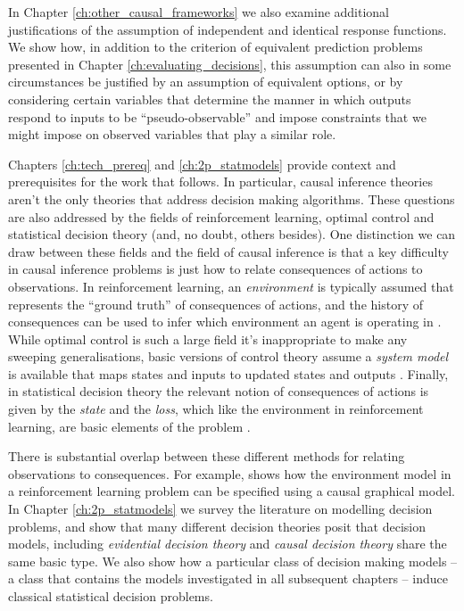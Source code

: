 In Chapter \ref{ch:other_causal_frameworks} we also examine additional justifications of the assumption of independent and identical response functions. We show how, in addition to the criterion of equivalent prediction problems presented in Chapter \ref{ch:evaluating_decisions}, this assumption can also in some circumstances be justified by an assumption of equivalent options, or by considering certain variables that determine the manner in which outputs respond to inputs to be ``pseudo-observable'' and impose constraints that we might impose on observed variables that play a similar role.

Chapters \ref{ch:tech_prereq} and \ref{ch:2p_statmodels} provide context and prerequisites for the work that follows. In particular, causal inference theories aren't the only theories that address decision making algorithms. These questions are also addressed by the fields of reinforcement learning, optimal control and statistical decision theory (and, no doubt, others besides). One distinction we can draw between these fields and the field of causal inference is that a key difficulty in causal inference problems is just how to relate consequences of actions to observations. In reinforcement learning, an \emph{environment} is typically assumed that represents the ``ground truth'' of consequences of actions, and the history of consequences can be used to infer which environment an agent is operating in \citep{barto_reinforcement_1998}. While optimal control is such a large field it's inappropriate to make any sweeping generalisations, basic versions of control theory assume a \emph{system model} is available that maps states and inputs to updated states and outputs \citep{ogata_discrete-time_1995}. Finally, in statistical decision theory the relevant notion of consequences of actions is given by the \emph{state} and the \emph{loss}, which like the environment in reinforcement learning, are basic elements of the problem \citep{wald_statistical_1950}.

There is substantial overlap between these different methods for relating observations to consequences. For example, \citet[Chap.~4]{lattimore_learning_2017} shows how the environment model in a reinforcement learning problem can be specified using a causal graphical model. In Chapter \ref{ch:2p_statmodels} we survey the literature on modelling decision problems, and show that many different decision theories posit that decision models, including \emph{evidential decision theory} and \emph{causal decision theory} share the same basic type. We also show how a particular class of decision making models -- a class that contains the models investigated in all subsequent chapters -- induce classical statistical decision problems.

